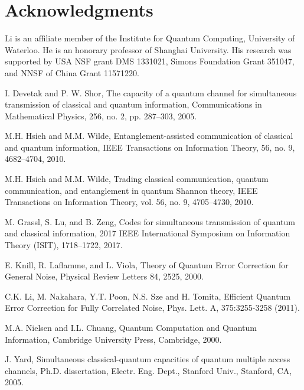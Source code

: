 \documentclass[11pt]{article}
\begin{document}
\section*{Acknowledgments}


Li is an affiliate member of the Institute for Quantum Computing,
University of Waterloo. He is an honorary professor of Shanghai
University. His research was supported by USA NSF grant DMS 1331021,
Simons Foundation Grant 351047, and NNSF of China Grant 11571220. 


\begin{thebibliography}{WWW}


 I. Devetak and P. W. Shor,  The capacity of a quantum channel
for simultaneous transmission of classical and quantum information, 
Communications in Mathematical Physics,  256, no. 2, pp. 287–303,
2005.



  M.H. Hsieh  and M.M. Wilde,  Entanglement-assisted communication of classical and quantum information, IEEE Transactions on Information Theory, 56, no. 9, 4682--4704, 2010.

 M.H. Hsieh  and M.M. Wilde,  Trading classical communication, quantum communication, and entanglement in quantum Shannon theory, IEEE Transactions on Information
Theory, vol. 56, no. 9,   4705--4730,   2010.


 M. Grassl, S. Lu, and B. Zeng, Codes for simultaneous transmission of quantum and 
classical information, 
2017 IEEE International Symposium on Information Theory (ISIT),  1718--1722, 2017.


E. Knill, R. Laflamme, and L. Viola, 
Theory of Quantum Error Correction for General Noise,
Physical Review
Letters 84, 2525, 2000.

 C.K. Li, M. Nakahara, Y.T. Poon, N.S. Sze and H. Tomita,
Efficient Quantum Error Correction for Fully Correlated Noise, 
Phys. Lett. A, 375:3255-3258 (2011).

 M.A. Nielsen and I.L. Chuang,
Quantum Computation and Quantum Information, 
Cambridge University Press, Cambridge, 2000.

 J. Yard,  Simultaneous classical-quantum capacities of quantum multiple
access channels,  Ph.D. dissertation, Electr. Eng. Dept., Stanford
Univ., Stanford, CA, 2005.
 

\end{thebibliography}
\end{document}
